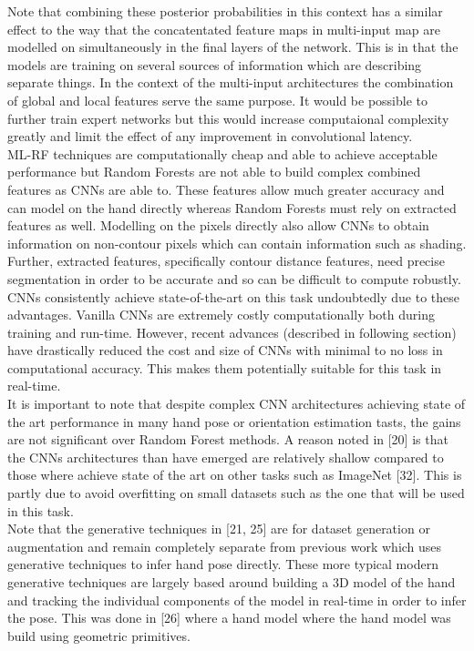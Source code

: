 \documentclass{article}
\begin{document}
Note that combining these posterior probabilities in this context has a similar effect to the way that the concatentated feature maps in multi-input map are modelled on simultaneously in the final layers of the network. This is in that the models are training on several sources of information which are describing separate things. In the context of the multi-input architectures the combination of global and local features serve the same purpose. It would be possible to further train expert networks but this would increase computaional complexity greatly and limit the effect of any improvement in convolutional latency. \\

ML-RF techniques are computationally cheap and able to achieve acceptable performance but Random Forests are not able to build complex combined features as CNNs are able to. These features allow much greater accuracy and can model on the hand directly whereas Random Forests must rely on extracted features as well. Modelling on the pixels directly also allow CNNs to obtain information on non-contour pixels which can contain information such as shading. Further, extracted features, specifically contour distance features, need precise segmentation in order to be accurate and so can be difficult to compute robustly. \\

 CNNs consistently achieve state-of-the-art on this task undoubtedly due to these advantages. Vanilla CNNs are extremely costly computationally both during training and run-time. However, recent advances (described in following section) have drastically reduced the cost and size of CNNs with minimal to no loss in computational accuracy. This makes them potentially suitable for this task in real-time. \\

It is important to note that despite complex CNN architectures achieving state of the art performance in many hand pose or orientation estimation tasts, the gains are not significant over Random Forest methods. A reason noted in [20] is that the CNNs architectures than have emerged are relatively shallow compared to those where achieve state of the art on other tasks such as ImageNet [32]. This is partly due to avoid overfitting on small datasets such as the one that will be used in this task. \\

Note that the generative techniques in [21, 25] are for dataset generation or augmentation and remain completely separate from previous work which uses generative techniques to infer hand pose directly. These more typical modern generative techniques are largely based around building a 3D model of the hand and tracking the individual components of the model in real-time in order to infer the pose. This was done  in [26] where a hand model  where the hand model was build using geometric primitives.\\
\end{document}
